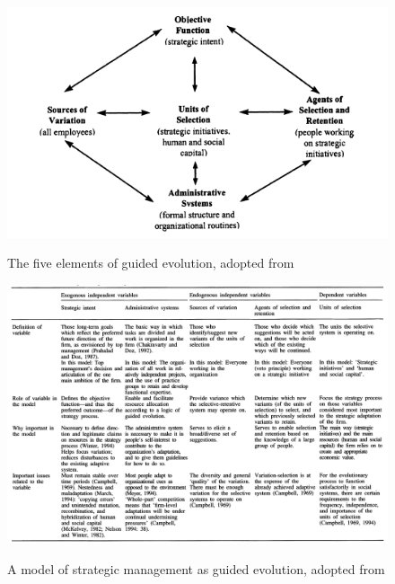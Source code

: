 \documentclass[12pt,letterpaper]{article}
\begin{document}
\begin{figure}[h]
\begin{centering}
  \caption{The five elements of guided evolution, adopted from \cite{Lovas2000}}
  \includegraphics[width=\textwidth]{Lovas2000a}
  \label{fig:Lovas2000a}
\end{centering}
\end{figure}

\begin{figure}[h]
\begin{centering}
  \caption{A model of strategic management as guided evolution, adopted from \cite{Lovas2000}}
  \includegraphics[width=\textwidth]{Lovas2000b}
  \label{fig:Lovas2000b}
\end{centering}
\end{figure}
\end{document}
